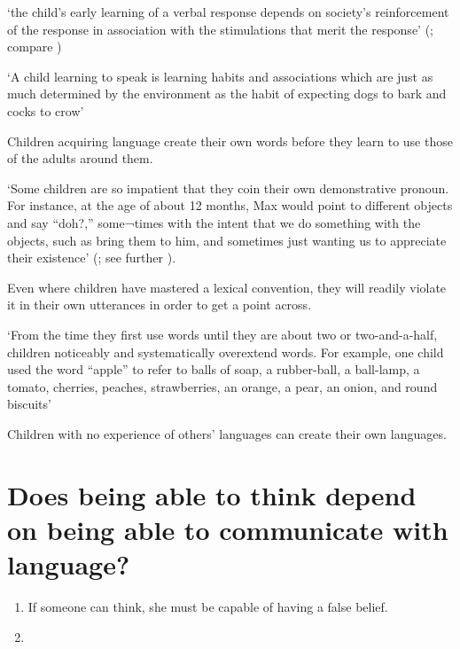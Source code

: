 \documentclass[12pt]{extarticle}
\begin{document}
\begin{multicols}{3}
‘the child’s early learning of a verbal response depends on society's reinforcement of the response in association with the stimulations that merit the response’
(\citep[p.\ 82]{Quine:1960fe}; compare \citep[pp.\ 28--9]{Quine:1974rd})
 
‘A child learning to speak is learning habits and associations which are just as much determined by the environment as the habit of expecting dogs to bark and cocks to crow’
\citep[p.\ 71]{Russell:1921ww}
 
Children acquiring language create their own words before they learn to use those of the adults around them.
 
‘Some children are so impatient that they coin their own demonstrative pronoun.  For instance, at the age of about 12 months, Max would point to different objects and say “doh?,” some¬times with the intent that we do something with the objects, such as bring them to him, and sometimes just wanting us to appreciate their existence’
(\citealp[p.\ 122]{Bloom:2000qz}; see further \citealp{Clark:1981bi,Clark:1982hj}).
 
Even where children have mastered a lexical convention, they will readily violate it in their own utterances in order to get a point across.
 
‘From the time they first use words until they are about two or two-and-a-half, children noticeably and systematically overextend words.  For example, one child used the word “apple” to refer to balls of soap, a rubber-ball, a ball-lamp, a tomato, cherries, peaches, strawberries, an orange, a pear, an onion, and round biscuits’
\citep[p.\ 35]{Clark:1993bv}
 
Children with no experience of others' languages can create their own languages.
\citep{Kegl:1999es,Senghas:2001zm,Goldin-Meadow:2003pj}
 
 
 
\section{Does being able to think depend on being able to communicate with language?}
 
\begin{enumerate}
 
\item
 
If someone can think, she must be capable of having a false belief.
 
\item
 

\end{enumerate}
\end{multicols}
\end{document}
